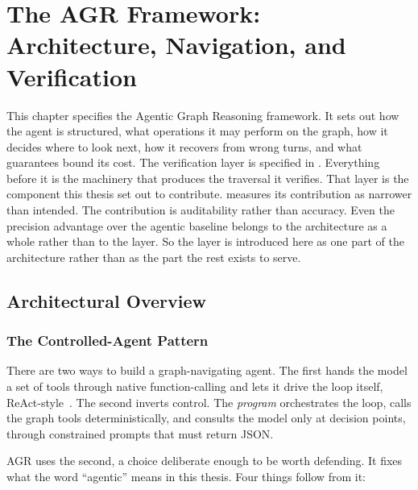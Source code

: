 \chapter{The AGR Framework: Architecture, Navigation, and
Verification}\label{ch:framework}

This chapter specifies the Agentic Graph Reasoning framework. It sets out how
the agent is structured, what operations it may perform on the graph, how it
decides where to look next, how it recovers from wrong turns, and what
guarantees bound its cost. The verification layer is specified in
. Everything before it is the machinery that
produces the traversal it verifies. That layer is the component this thesis set
out to contribute.  measures its contribution as narrower than
intended. The contribution is auditability rather than accuracy. Even the
precision advantage over the agentic baseline belongs to the architecture as a
whole rather than to the layer. So the layer is introduced here as one part of
the architecture rather than as the part the rest exists to serve.

\section{Architectural Overview}\label{sec:architecture}

\subsection{The Controlled-Agent Pattern}

There are two ways to build a graph-navigating agent. The first hands the model
a set of tools through native function-calling and lets it drive the loop
itself, ReAct-style~\cite{yao2023react}. The second inverts
control. The \emph{program} orchestrates the
loop, calls the graph tools deterministically, and consults the model only at
decision points, through constrained prompts that must return JSON.

AGR uses the second, a choice deliberate enough to be worth defending. It fixes
what the word ``agentic'' means in this thesis. Four things follow from it:

